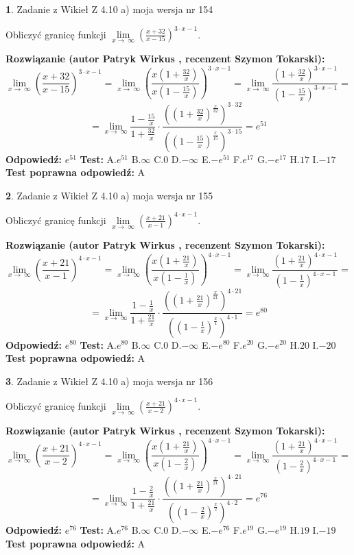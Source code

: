 \documentclass[12pt, a4paper]{article}
\theoremstyle{definition} %
\newtheorem{zad}{}
\newcommand{\zadStart}[1]{\begin{zad}#1\newline}
\newcommand{\zadStop}{\end{zad}}
\newcommand{\rozwStart}[2]{\noindent \textbf{Rozwiązanie (autor #1 , recenzent #2): }\newline}
\newcommand{\rozwStop}{\newline}
\newcommand{\odpStart}{\noindent \textbf{Odpowiedź:}\newline}
\newcommand{\odpStop}{\newline}
\newcommand{\testStart}{\noindent \textbf{Test:}\newline}
\newcommand{\testStop}{\newline}
\newcommand{\kluczStart}{\noindent \textbf{Test poprawna odpowiedź:}\newline}
\newcommand{\kluczStop}{\newline}
\begin{document}
\zadStart{Zadanie z Wikieł Z 4.10 a) moja wersja nr 154}

Obliczyć granicę funkcji  $\lim\limits_{x\to\ \infty}(\frac{x+32}{x-15})^{3\cdot x-1}$.
\zadStop
\rozwStart{Patryk Wirkus}{Szymon Tokarski}
$$\lim\limits_{x\to\ \infty}(\frac{x+32}{x-15})^{3\cdot x-1} = \lim\limits_{x\to\ \infty}(\frac{x(1+\frac{32}{x})}{x(1-\frac{15}{x})})^{3\cdot x-1}=\lim\limits_{x\to\ \infty}\frac{(1+\frac{32}{x})^{3\cdot x-1}}{(1-\frac{15}{x})^{3\cdot x-1}}=$$
$$=\lim\limits_{x\to\ \infty}\frac{1-\frac{15}{x}}{1+\frac{32}{x}}\cdot\frac{((1+\frac{32}{x})^{\frac{x}{32}})^{3\cdot32}}{((1-\frac{15}{x})^{\frac{x}{15}})^{3\cdot15}}=e^{51}$$
\rozwStop
\odpStart
$e^{51}$
\odpStop
\testStart
A.$e^{51}$ B.$\infty$ C.$0$ D.$-\infty$ E.$-e^{51}$
F.$e^{17}$ G.$-e^{17}$
H.$17$
I.$-17$
\testStop
\kluczStart
A
\kluczStop



\zadStart{Zadanie z Wikieł Z 4.10 a) moja wersja nr 155}

Obliczyć granicę funkcji  $\lim\limits_{x\to\ \infty}(\frac{x+21}{x-1})^{4\cdot x-1}$.
\zadStop
\rozwStart{Patryk Wirkus}{Szymon Tokarski}
$$\lim\limits_{x\to\ \infty}(\frac{x+21}{x-1})^{4\cdot x-1} = \lim\limits_{x\to\ \infty}(\frac{x(1+\frac{21}{x})}{x(1-\frac{1}{x})})^{4\cdot x-1}=\lim\limits_{x\to\ \infty}\frac{(1+\frac{21}{x})^{4\cdot x-1}}{(1-\frac{1}{x})^{4\cdot x-1}}=$$
$$=\lim\limits_{x\to\ \infty}\frac{1-\frac{1}{x}}{1+\frac{21}{x}}\cdot\frac{((1+\frac{21}{x})^{\frac{x}{21}})^{4\cdot21}}{((1-\frac{1}{x})^{\frac{x}{1}})^{4\cdot1}}=e^{80}$$
\rozwStop
\odpStart
$e^{80}$
\odpStop
\testStart
A.$e^{80}$ B.$\infty$ C.$0$ D.$-\infty$ E.$-e^{80}$
F.$e^{20}$ G.$-e^{20}$
H.$20$
I.$-20$
\testStop
\kluczStart
A
\kluczStop



\zadStart{Zadanie z Wikieł Z 4.10 a) moja wersja nr 156}

Obliczyć granicę funkcji  $\lim\limits_{x\to\ \infty}(\frac{x+21}{x-2})^{4\cdot x-1}$.
\zadStop
\rozwStart{Patryk Wirkus}{Szymon Tokarski}
$$\lim\limits_{x\to\ \infty}(\frac{x+21}{x-2})^{4\cdot x-1} = \lim\limits_{x\to\ \infty}(\frac{x(1+\frac{21}{x})}{x(1-\frac{2}{x})})^{4\cdot x-1}=\lim\limits_{x\to\ \infty}\frac{(1+\frac{21}{x})^{4\cdot x-1}}{(1-\frac{2}{x})^{4\cdot x-1}}=$$
$$=\lim\limits_{x\to\ \infty}\frac{1-\frac{2}{x}}{1+\frac{21}{x}}\cdot\frac{((1+\frac{21}{x})^{\frac{x}{21}})^{4\cdot21}}{((1-\frac{2}{x})^{\frac{x}{2}})^{4\cdot2}}=e^{76}$$
\rozwStop
\odpStart
$e^{76}$
\odpStop
\testStart
A.$e^{76}$ B.$\infty$ C.$0$ D.$-\infty$ E.$-e^{76}$
F.$e^{19}$ G.$-e^{19}$
H.$19$
I.$-19$
\testStop
\kluczStart
A
\kluczStop
\end{document}
